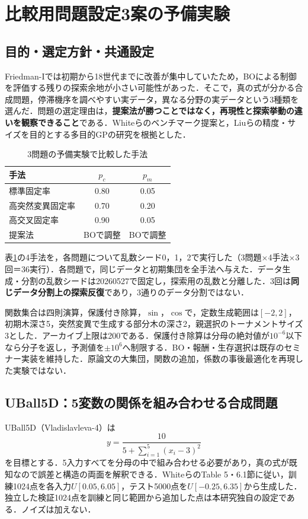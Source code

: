\documentclass[a4paper,10pt,twocolumn]{ltjsarticle}
\begin{document}
\section{比較用問題設定3案の予備実験}
\subsection{目的・選定方針・共通設定}
Friedman-Iでは初期から18世代までに改善が集中していたため，BOによる制御を評価する残りの探索余地が小さい可能性があった．そこで，真の式が分かる合成問題，停滞機序を調べやすい実データ，異なる分野の実データという3種類を選んだ．問題の選定理由は，\textbf{提案法が勝つことではなく，再現性と探索挙動の違いを観察できること}である．Whiteらのベンチマーク提案\cite{white2013}と，Liuらの精度・サイズを目的とする多目的GPの研究\cite{liu2022}を根拠とした．

\begin{table}[tb]
\centering\small
\caption{3問題の予備実験で比較した手法}
\label{tab:methods}
\begin{tabular}{@{}lcc@{}}\toprule
手法 & \(p_c\) & \(p_m\)\\\midrule
標準固定率 & 0.80 & 0.05\\
高突然変異固定率 & 0.70 & 0.20\\
高交叉固定率 & 0.90 & 0.05\\
提案法 & BOで調整 & BOで調整\\\bottomrule
\end{tabular}
\end{table}

表\ref{tab:methods}の4手法を，各問題について乱数シード0，1，2で実行した（3問題\(\times\)4手法\(\times\)3回＝36実行）．各問題で，同じデータと初期集団を全手法へ与えた．データ生成・分割の乱数シードは20260527で固定し，探索用の乱数と分離した．3回は\textbf{同じデータ分割上の探索反復}であり，3通りのデータ分割ではない．

関数集合は四則演算，保護付き除算，\(\sin\)，\(\cos\)で，定数生成範囲は\([-2,2]\)，初期木深さ5，突然変異で生成する部分木の深さ2，親選択のトーナメントサイズ3とした．アーカイブ上限は200である．保護付き除算は分母の絶対値が\(10^{-6}\)以下なら分子を返し，予測値を\(\pm10^6\)へ制限する．BO・報酬・生存選択は既存のセミナー実装を維持した．原論文の大集団，関数の追加，係数の事後最適化を再現した実験ではない．

\subsection{UBall5D：5変数の関係を組み合わせる合成問題}
UBall5D（Vladislavleva-4）は
\begin{equation}
 y=\frac{10}{5+\sum_{i=1}^{5}(x_i-3)^2}
\end{equation}
を目標とする．5入力すべてを分母の中で組み合わせる必要があり，真の式が既知なので誤差と構造の両面を解釈できる．WhiteらのTable 5・6.1節に従い，訓練1024点を各入力\(U[0.05,6.05]\)，テスト5000点を\(U[-0.25,6.35]\)から生成した\cite{white2013}．独立した検証1024点を訓練と同じ範囲から追加した点は本研究独自の設定である．ノイズは加えない．
\end{document}
